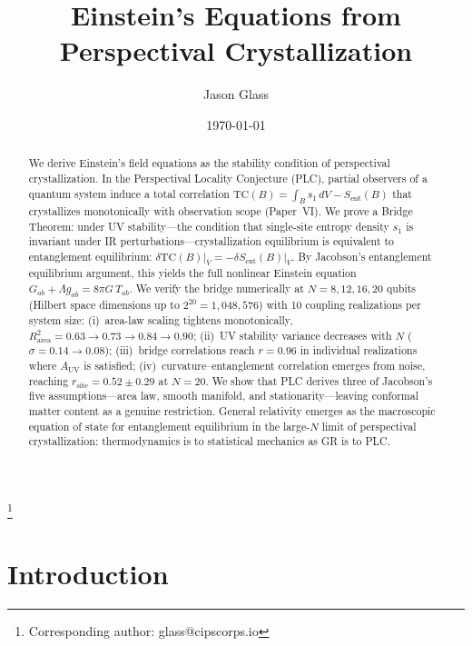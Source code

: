 \documentclass[aps,pra,twocolumn,superscriptaddress,floatfix]{revtex4-2}
\begin{document}
\title{Einstein's Equations from Perspectival Crystallization}

\author{Jason Glass}
\thanks{Corresponding author: glass@cipscorps.io}

\date{\today}

\begin{abstract}
We derive Einstein's field equations as the stability condition of perspectival crystallization.
In the Perspectival Locality Conjecture (PLC), partial observers of a quantum system induce a total correlation $\mathrm{TC}(B) = \int_B s_1 \, dV - S_{\mathrm{ent}}(B)$ that crystallizes monotonically with observation scope (Paper~VI).
We prove a Bridge Theorem: under UV stability---the condition that single-site entropy density $s_1$ is invariant under IR perturbations---crystallization equilibrium is equivalent to entanglement equilibrium:
$\delta\mathrm{TC}(B)\big|_V = -\delta S_{\mathrm{ent}}(B)\big|_V$.
By Jacobson's entanglement equilibrium argument, this yields the full nonlinear Einstein equation $G_{ab} + \Lambda g_{ab} = 8\pi G \, T_{ab}$.
We verify the bridge numerically at $N = 8, 12, 16, 20$ qubits (Hilbert space dimensions up to $2^{20} = 1{,}048{,}576$) with 10 coupling realizations per system size:
(i)~area-law scaling tightens monotonically, $R^2_{\mathrm{area}} = 0.63 \to 0.73 \to 0.84 \to 0.90$;
(ii)~UV stability variance decreases with $N$ ($\sigma = 0.14 \to 0.08$);
(iii)~bridge correlations reach $r = 0.96$ in individual realizations where $A_{\mathrm{UV}}$ is satisfied;
(iv)~curvature--entanglement correlation emerges from noise, reaching $r_{\mathrm{site}} = 0.52 \pm 0.29$ at $N\!=\!20$.
We show that PLC derives three of Jacobson's five assumptions---area law, smooth manifold, and stationarity---leaving conformal matter content as a genuine restriction.
General relativity emerges as the macroscopic equation of state for entanglement equilibrium in the large-$N$ limit of perspectival crystallization: thermodynamics is to statistical mechanics as GR is to PLC.
\end{abstract}

\maketitle


\section{Introduction}
\label{sec:intro}
\end{document}
